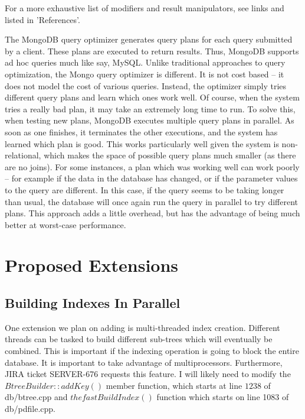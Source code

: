 \documentclass{dependencies/acm_proc_article-sp}
\begin{document}
For a more exhaustive list of modifiers and result manipulators, see links\cite{11} and \cite{12} listed in 'References'.

The MongoDB query optimizer generates query plans for each query submitted by a client.
These plans are executed to return results.
Thus, MongoDB supports ad hoc queries much like say, MySQL.
Unlike traditional approaches to query optimization, the Mongo query optimizer is different.
It is not cost based -- it does not model the cost of various queries.
Instead, the optimizer simply tries different query plans and learn which ones work well.
Of course, when the system tries a really bad plan, it may take an extremely long time to run.
To solve this, when testing new plans, MongoDB executes multiple query plans in parallel.
As soon as one finishes, it terminates the other executions, and the system has learned which plan is good.
This works particularly well given the system is non-relational, which makes the space of possible query plans much smaller (as there are no joins).
For some instances, a plan which was working well can work poorly -- for example if the data in the database has changed, or if the parameter values to the query are different.
In this case, if the query seems to be taking longer than usual, the database will once again run the query in parallel to try different plans.
This approach adds a little overhead, but has the advantage of being much better at worst-case performance.
\section{Proposed Extensions}
\subsection{Building Indexes In Parallel}

One extension we plan on adding is multi-threaded index creation.
Different threads can be tasked to build different sub-trees which will eventually be combined.
This is important if the indexing operation is going to block the entire database.
It is important to take advantage of multiprocessors.
Furthermore, JIRA ticket SERVER-676 requests this feature\cite{8}.
I will likely need to modify the $BtreeBuilder::addKey()$ member function, which starts at line $1238$ of db/btree.cpp and $thefastBuildIndex()$ function which starts on line 1083 of db/pdfile.cpp.
\end{document}
